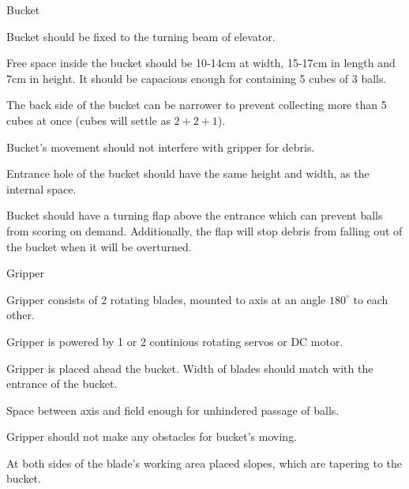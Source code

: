 \begin{enumerate*}
  	\item Bucket
  	\begin{enumerate*}
  		\item Bucket should be fixed to the turning beam of elevator.
  		
  		\item Free space inside the bucket should be 10-14cm at width, 15-17cm in length and 7cm in height. It should be capacious enough for containing 5 cubes of 3 balls.
  		
  		\item The back side of the bucket can be narrower to prevent collecting more than 5 cubes at once (cubes will settle as $2+2+1$). 
  		
  		\item Bucket's movement should not interfere with gripper for debris.
  		
  		
  		\item Entrance hole of the bucket should have the same height and width, as the internal space.
  		
  		\item Bucket should have a turning flap above the entrance which can prevent balls from scoring on demand. Additionally, the flap will stop debris from falling out of the bucket when it will be overturned.
  	\end{enumerate*}
  	
  	\item Gripper
  	\begin{enumerate*}
  		\item Gripper consists of 2 rotating blades, mounted to axis at an angle $180^{\circ}$ to each other.
  		
  		\item Gripper is powered by 1 or 2 continious rotating servos or DC motor.
  		
  		\item Gripper is placed ahead the bucket. Width of blades should match with the entrance of the bucket.
  		
  		\item Space between axis and field enough for unhindered passage of balls.
  		
  		\item Gripper should not make any obstacles for bucket's moving.
  		
  		\item At both sides of the blade's working area placed slopes, which are tapering to the bucket.
  	\end{enumerate*}
  	

\end{enumerate*}
